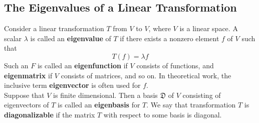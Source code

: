 \documentclass[letter]{article}
\newenvironment{definition}[1][Definition]{\begin{trivlist}
\item[\hskip \labelsep {\bfseries #1}]}{\end{trivlist}}
\begin{document}
\subsection{The Eigenvalues of a Linear Transformation}
\begin{definition}
Consider a linear transformation $T$ from $V$ to $V$, where $V$ is a linear space. A scalar $\lambda$ is called an \textbf{eigenvalue} of $T$ if there exists a nonzero element $f$ of $V$ such that
\[
T(f) = \lambda f
\]
Such an $F$ is called an \textbf{eigenfunction} if $V$ consists of functions, and \textbf{eigenmatrix} if $V$ consists of matrices, and so on. In theoretical work, the inclusive term \textbf{eigenvector} is often used for $f$. \\
Suppose that $V$ is finite dimensional. Then a basis $\mathfrak{D}$ of $V$ consisting of eigenvectors of $T$ is called an \textbf{eigenbasis} for $T$. We say that transformation $T$ is \textbf{diagonalizable} if the matrix $T$ with respect to some basis is diagonal.
\end{definition}
\end{document}
